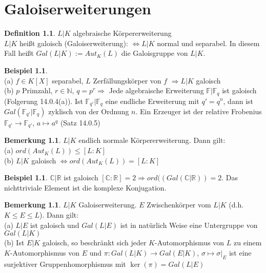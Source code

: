 \documentclass[10pt,a4paper,numbers=endperiod]{scrreprt}
\theoremstyle{definition}
\newtheorem{defi}[satz]{Definition}
\newtheorem{bem}[satz]{Bemerkung}
\newtheorem{bsp}[satz]{Beispiel}
\def\CC{{\mathbb C}}
\def\RR{{\mathbb R}}
\def\NN{{\mathbb N}}
\def\FF{{\mathbb F}}
\begin{document}
\chapter{Galoiserweiterungen}

\begin{defi}
	$L|K$ algebraische Körpererweiterung\\
	$L|K$ heißt galoisch (Galoiserweiterung): $\Leftrightarrow L|K$ normal und separabel. In diesem Fall heißt $Gal(L|K):=Aut_K(L)$ die Galoisgruppe von $L|K$.
\end{defi}

\begin{bsp}
	$ $\\
	(a) $f \in K[X]$ separabel, $L$ Zerfällungskörper von $f$ $\Rightarrow L|K$ galoisch\\
	(b) $p$ Primzahl, $r \in \NN$, $q = p^r \Rightarrow$ Jede algebraische Erweiterung $\FF|\FF_q$ ist galoisch (Folgerung 14.0.4(a)). Ist $\FF_{q'}|\FF_{q}$ eine endliche Erweiterung mit $q' = q^n$,  dann ist $Gal(\FF_{q'}|\FF_{q})$ zyklisch von der Ordnung $n$. Ein Erzeuger ist der relative Frobenius $\FF_{q'} \rightarrow \FF_{q'}$, $a \mapsto a^q$ (Satz 14.0.5)
\end{bsp}

\begin{bem}
	$L|K$ endlich normale Körpererweiterung. Dann gilt:\\
	(a) $ord(Aut_K(L)) \leq [L:K]$\\
	(b) $L|K$ galoisch $\Leftrightarrow ord(Aut_K(L)) = [L:K]$
\end{bem}

\begin{bsp}
	$\CC|\RR$ ist galoisch $[\CC:\RR] = 2 \Rightarrow ord((Gal(\CC|\RR)) = 2$. Das nichttriviale Element ist die komplexe Konjugation.
\end{bsp}

\begin{bem}
	$L|K$ Galoiserweiterung. $E$ Zwischenkörper vom $L|K$ (d.h. $K \leq E \leq L$). Dann gilt:\\
	(a) $L|E$ ist galoisch und $Gal(L|E)$ ist in natürlich Weise eine Untergruppe von $Gal(L|K)$\\
	(b) Ist $E|K$ galoisch, so beschränkt sich jeder $K$-Automorphismus von $L$ zu einem $K$-Automorphismus von $E$ und $\pi: Gal(L|K) \rightarrow Gal(E|K)$, $\sigma \mapsto \sigma|_E$ ist eine surjektiver Gruppenhomorphismus mit $\ker(\pi) = Gal(L|E)$ 
\end{bem}
\end{document}
